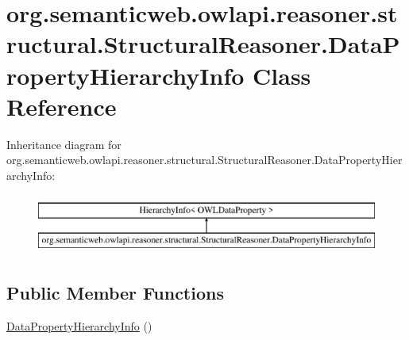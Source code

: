 \hypertarget{classorg_1_1semanticweb_1_1owlapi_1_1reasoner_1_1structural_1_1_structural_reasoner_1_1_data_property_hierarchy_info}{\section{org.\-semanticweb.\-owlapi.\-reasoner.\-structural.\-Structural\-Reasoner.\-Data\-Property\-Hierarchy\-Info Class Reference}
\label{classorg_1_1semanticweb_1_1owlapi_1_1reasoner_1_1structural_1_1_structural_reasoner_1_1_data_property_hierarchy_info}
}
Inheritance diagram for org.\-semanticweb.\-owlapi.\-reasoner.\-structural.\-Structural\-Reasoner.\-Data\-Property\-Hierarchy\-Info\-:\begin{figure}[H]
\begin{center}
\leavevmode
\includegraphics[height=2.000000cm]{classorg_1_1semanticweb_1_1owlapi_1_1reasoner_1_1structural_1_1_structural_reasoner_1_1_data_property_hierarchy_info}
\end{center}
\end{figure}
\subsection*{Public Member Functions}
\begin{DoxyCompactItemize}
\item 
\hyperlink{classorg_1_1semanticweb_1_1owlapi_1_1reasoner_1_1structural_1_1_structural_reasoner_1_1_data_property_hierarchy_info_a669becd163478d8a30d3528c181da5ab}{Data\-Property\-Hierarchy\-Info} ()
\end{DoxyCompactItemize}
